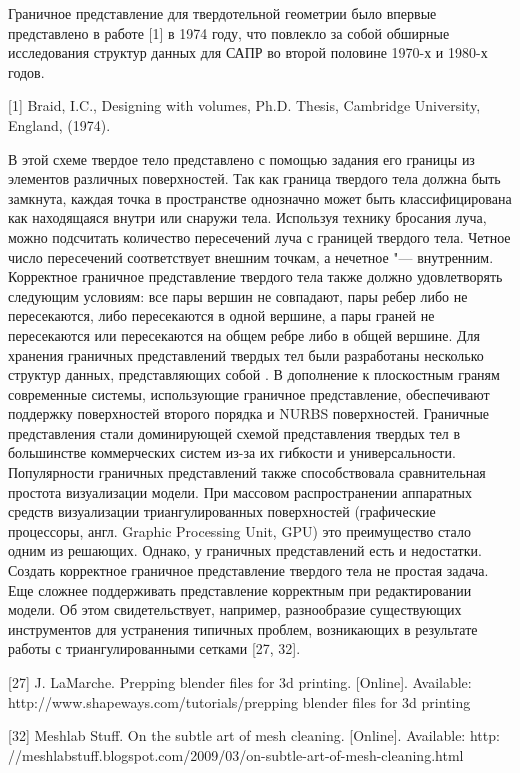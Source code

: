 {{{{{Граничное представление для твердотельной геометрии было впервые представлено в работе [1] в 1974 году, что повлекло за собой обширные исследования структур данных для САПР во второй половине 1970-х и 1980-х годов.

[1] Braid, I.C., Designing with volumes, Ph.D. Thesis, Cambridge University, England, (1974).

В этой схеме твердое тело представлено с помощью задания его границы из элементов различных поверхностей. Так как граница твердого тела должна быть замкнута, каждая точка в пространстве однозначно может быть классифицирована как находящаяся внутри или снаружи тела. Используя технику бросания луча, можно подсчитать количество пересечений  луча с границей твердого тела. Четное число пересечений соответствует внешним точкам, а нечетное "--- внутренним. Корректное граничное представление твердого тела также должно удовлетворять следующим условиям: все пары вершин не совпадают, пары ребер либо не пересекаются, либо пересекаются в одной вершине, а пары граней не пересекаются или пересекаются на общем ребре либо в общей вершине. Для хранения граничных представлений твердых тел были разработаны несколько структур данных, представляющих собой . В дополнение к плоскостным граням современные системы, использующие граничное представление, обеспечивают поддержку поверхностей второго порядка и NURBS поверхностей. Граничные представления стали доминирующей схемой представления твердых тел в большинстве коммерческих систем из-за их гибкости и универсальности. Популярности граничных представлений также способствовала сравнительная простота визуализации модели. При массовом распространении аппаратных средств визуализации триангулированных поверхностей (графические процессоры, англ. Graphic Processing Unit, GPU)  это преимущество стало одним из решающих. Однако, у граничных представлений есть и недостатки. Создать корректное граничное представление твердого тела не простая задача. Еще сложнее поддерживать представление корректным при редактировании модели. Об этом свидетельствует, например, разнообразие существующих инструментов для устранения типичных проблем, возникающих в результате работы с триангулированными сетками [27, 32].

[27] J. LaMarche. Prepping blender files for 3d printing. [Online]. Available:
http://www.shapeways.com/tutorials/prepping blender files for 3d printing

[32] Meshlab Stuff. On the subtle art of mesh cleaning. [Online]. Available: http:
//meshlabstuff.blogspot.com/2009/03/on-subtle-art-of-mesh-cleaning.html

}}}}}
